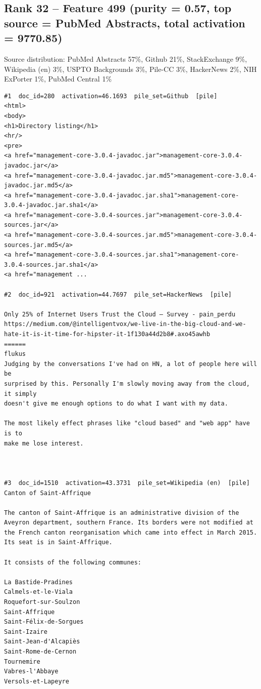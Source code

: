 \subsection*{Rank 32 -- Feature 499 (purity = 0.57, top source = PubMed Abstracts, total activation = 9770.85)}

Source distribution: PubMed Abstracts 57\%, Github 21\%, StackExchange 9\%, Wikipedia (en) 3\%, USPTO Backgrounds 3\%, Pile-CC 3\%, HackerNews 2\%, NIH ExPorter 1\%, PubMed Central 1\%

\begin{verbatim}
#1  doc_id=280  activation=46.1693  pile_set=Github  [pile]
<html>
<body>
<h1>Directory listing</h1>
<hr/>
<pre>
<a href="management-core-3.0.4-javadoc.jar">management-core-3.0.4-javadoc.jar</a>
<a href="management-core-3.0.4-javadoc.jar.md5">management-core-3.0.4-javadoc.jar.md5</a>
<a href="management-core-3.0.4-javadoc.jar.sha1">management-core-3.0.4-javadoc.jar.sha1</a>
<a href="management-core-3.0.4-sources.jar">management-core-3.0.4-sources.jar</a>
<a href="management-core-3.0.4-sources.jar.md5">management-core-3.0.4-sources.jar.md5</a>
<a href="management-core-3.0.4-sources.jar.sha1">management-core-3.0.4-sources.jar.sha1</a>
<a href="management ...

#2  doc_id=921  activation=44.7697  pile_set=HackerNews  [pile]

Only 25% of Internet Users Trust the Cloud – Survey - pain_perdu
https://medium.com/@intelligentvox/we-live-in-the-big-cloud-and-we-hate-it-is-it-time-for-hipster-it-1f130a44d2b8#.axo45awhb
======
flukus
Judging by the conversations I've had on HN, a lot of people here will be
surprised by this. Personally I'm slowly moving away from the cloud, it simply
doesn't give me enough options to do what I want with my data.

The most likely effect phrases like "cloud based" and "web app" have is to
make me lose interest.



#3  doc_id=1510  activation=43.3731  pile_set=Wikipedia (en)  [pile]
Canton of Saint-Affrique

The canton of Saint-Affrique is an administrative division of the Aveyron department, southern France. Its borders were not modified at the French canton reorganisation which came into effect in March 2015. Its seat is in Saint-Affrique.

It consists of the following communes:
 
La Bastide-Pradines
Calmels-et-le-Viala
Roquefort-sur-Soulzon
Saint-Affrique
Saint-Félix-de-Sorgues
Saint-Izaire
Saint-Jean-d'Alcapiès
Saint-Rome-de-Cernon
Tournemire
Vabres-l'Abbaye
Versols-et-Lapeyre


\end{verbatim}
